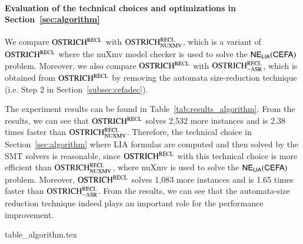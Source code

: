 
\paragraph*{Evaluation of the technical choices and optimizations in Section~\ref{sec:algorithm}}
%
We compare $\rm OSTRICH^{RECL}$ with $\rm OSTRICH^{RECL}_{\rm NUXMV}$, which is a variant of $\rm OSTRICH^{RECL}$ where the nuXmv model checker is used to solve the ${\sf NE_{LIA}(CEFA)}$ problem. Moreover, we also compare $\rm OSTRICH^{RECL}$ with $\rm OSTRICH^{RECL}_{\rm -ASR}$, which is obtained from $\rm OSTRICH^{RECL}$ by removing the automata size-reduction technique (i.e. Step 2 in Section~\ref{subsec:cefadec}). 

The experiment results can be found in Table~\ref{tab:results_algorithm}. From the results, we can see that $\rm OSTRICH^{RECL}$ solves 2,532 more instances and is 2.38 times faster than $\rm OSTRICH^{RECL}_{\rm NUXMV}$. 
Therefore, the technical choice in Section~\ref{sec:algorithm} where LIA formulas are computed and then solved by the SMT solvers is reasonable, since $\rm OSTRICH^{RECL}$ with this technical choice is more efficient than $\rm OSTRICH^{RECL}_{\rm NUXMV}$, where nuXmv is used to solve the ${\sf NE_{LIA}(CEFA)}$ problem. 
%
Moreover, $\rm OSTRICH^{RECL}$ solves 1,083 more instances and is 1.65 times faster than $\rm OSTRICH^{RECL}_{\rm -ASR}$. 
From the results, we can see that the automata-size reduction technique indeed plays an important role for the performance improvement. 

\begin{table}[htbp]
  {table_algorithm.tex}
  \caption{Evaluation of the technical choices and optimizations in Section~\ref{sec:algorithm}}\label{tab:results_algorithm}
\end{table}


